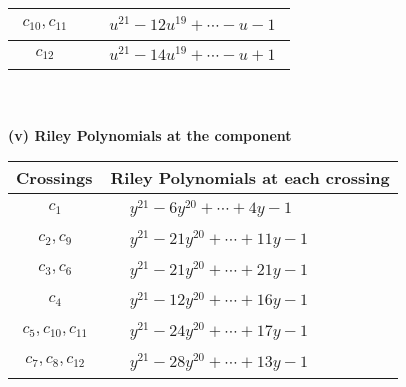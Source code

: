 \documentclass[1p]{elsarticle_modified}
\theoremstyle{definition}
\begin{document}
\begin{tabular}{m{50pt}|m{274pt}}
\hline $$\begin{aligned}c_{10},c_{11}\end{aligned}$$&$\begin{aligned}
&u^{21}-12 u^{19}+\cdots- u-1
\end{aligned}$\\
\hline $$\begin{aligned}c_{12}\end{aligned}$$&$\begin{aligned}
&u^{21}-14 u^{19}+\cdots- u+1
\end{aligned}$\\
\hline
\end{tabular}\\~\\
\newpage\renewcommand{\arraystretch}{1}
\flushleft \textbf{(v) Riley Polynomials at the component}\newline \\
\begin{tabular}{m{50pt}|m{274pt}}
Crossings & \hspace{64pt}Riley Polynomials at each crossing \\
\hline $$\begin{aligned}c_{1}\end{aligned}$$&$\begin{aligned}
&y^{21}-6 y^{20}+\cdots+4 y-1
\end{aligned}$\\
\hline $$\begin{aligned}c_{2},c_{9}\end{aligned}$$&$\begin{aligned}
&y^{21}-21 y^{20}+\cdots+11 y-1
\end{aligned}$\\
\hline $$\begin{aligned}c_{3},c_{6}\end{aligned}$$&$\begin{aligned}
&y^{21}-21 y^{20}+\cdots+21 y-1
\end{aligned}$\\
\hline $$\begin{aligned}c_{4}\end{aligned}$$&$\begin{aligned}
&y^{21}-12 y^{20}+\cdots+16 y-1
\end{aligned}$\\
\hline $$\begin{aligned}c_{5},c_{10},c_{11}\end{aligned}$$&$\begin{aligned}
&y^{21}-24 y^{20}+\cdots+17 y-1
\end{aligned}$\\
\hline $$\begin{aligned}c_{7},c_{8},c_{12}\end{aligned}$$&$\begin{aligned}
&y^{21}-28 y^{20}+\cdots+13 y-1
\end{aligned}$\\
\hline
\end{tabular}\\~\\
\end{document}
